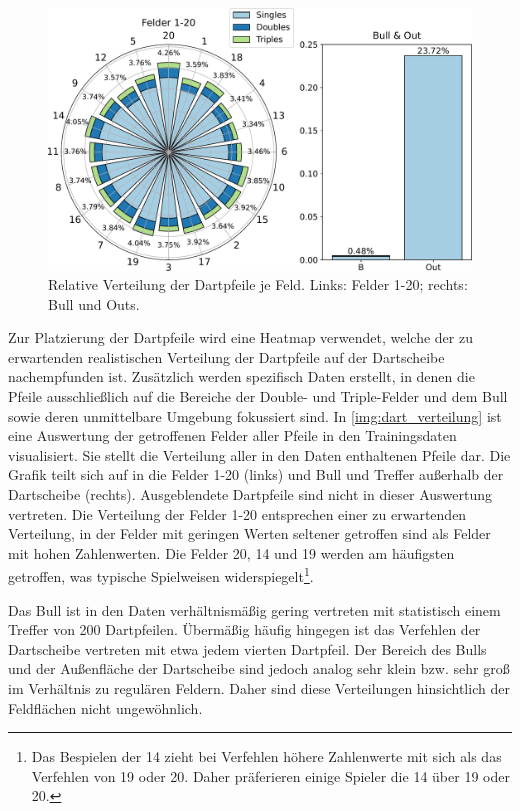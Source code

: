 \begin{figure}
    \centering
    \includegraphics[width=\textwidth]{imgs/rendering/ergebnisse/dartboard_stacked_final.pdf}
    \caption{Relative Verteilung der Dartpfeile je Feld. Links: Felder 1-20; rechts: Bull und Outs.}
    \label{img:dart_verteilung}
\end{figure}

Zur Platzierung der Dartpfeile wird eine Heatmap verwendet, welche der zu erwartenden realistischen Verteilung der Dartpfeile auf der Dartscheibe nachempfunden ist. Zusätzlich werden spezifisch Daten erstellt, in denen die Pfeile ausschließlich auf die Bereiche der Double- und Triple-Felder und dem Bull sowie deren unmittelbare Umgebung fokussiert sind. In \autoref{img:dart_verteilung} ist eine Auswertung der getroffenen Felder aller Pfeile in den Trainingsdaten visualisiert. Sie stellt die Verteilung aller in den Daten enthaltenen Pfeile dar. Die Grafik teilt sich auf in die Felder 1-20 (links) und Bull und Treffer außerhalb der Dartscheibe (rechts). Ausgeblendete Dartpfeile sind nicht in dieser Auswertung vertreten. Die Verteilung der Felder 1-20 entsprechen einer zu erwartenden Verteilung, in der Felder mit geringen Werten seltener getroffen sind als Felder mit hohen Zahlenwerten. Die Felder 20, 14 und 19 werden am häufigsten getroffen, was typische Spielweisen widerspiegelt\footnote{Das Bespielen der 14 zieht bei Verfehlen höhere Zahlenwerte mit sich als das Verfehlen von 19 oder 20. Daher präferieren einige Spieler die 14 über 19 oder 20.}.

Das Bull ist in den Daten verhältnismäßig gering vertreten mit statistisch einem Treffer von 200 Dartpfeilen. Übermäßig häufig hingegen ist das Verfehlen der Dartscheibe vertreten mit etwa jedem vierten Dartpfeil. Der Bereich des Bulls und der Außenfläche der Dartscheibe sind jedoch analog sehr klein bzw. sehr groß im Verhältnis zu regulären Feldern. Daher sind diese Verteilungen hinsichtlich der Feldflächen nicht ungewöhnlich.

